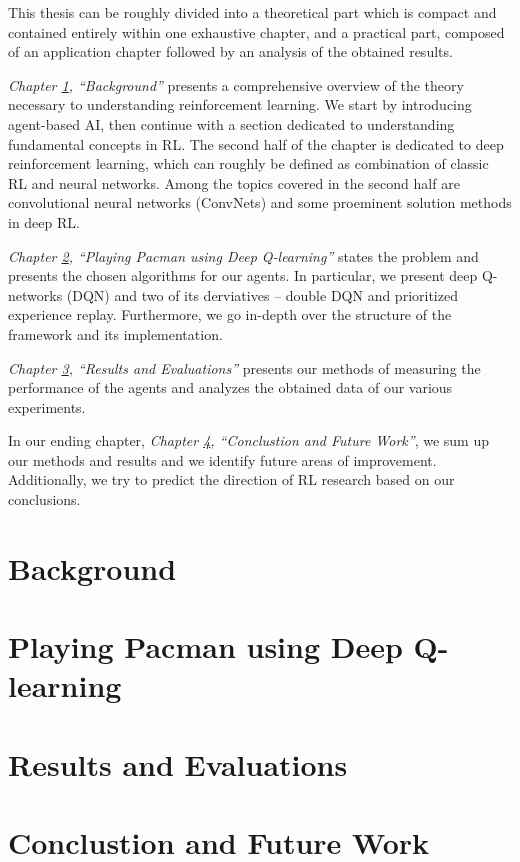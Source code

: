 \documentclass[12pt,twoside]{report}
\begin{document}
This thesis can be roughly divided into a theoretical part which is compact and contained entirely within one exhaustive chapter, and a practical part, composed of an application chapter followed by an analysis of the obtained results.

\emph{Chapter \ref{chapter:background}, ``Background''} presents a comprehensive overview of the theory necessary to understanding reinforcement learning.
We start by introducing agent-based AI, then continue with a
section dedicated to understanding fundamental concepts in RL.
The second half of the chapter is dedicated to deep reinforcement learning, which can roughly be defined as combination of classic RL and neural networks.
Among the topics covered in the second half are convolutional neural networks (ConvNets) and some proeminent solution methods in deep RL.

\emph{Chapter \ref{chapter:practical}, ``Playing Pacman using Deep Q-learning''} states the problem and presents the chosen algorithms for our agents.
In particular, we present deep Q-networks (DQN) and two of its derviatives -- double DQN and prioritized experience replay.
Furthermore, we go in-depth over the structure of the framework and its implementation.

\emph{Chapter \ref{chapter:results}, ``Results and Evaluations''} presents our methods of measuring the performance of the agents and analyzes the obtained data of our various experiments.

In our ending chapter, \emph{Chapter \ref{chapter:conclusion}, ``Conclustion and Future Work''}, we sum up our methods and results and we identify future areas of improvement. Additionally, we try to predict the direction of RL research based on our conclusions.

\chapter{Background} \label{chapter:background}


\chapter{Playing Pacman using Deep Q-learning} \label{chapter:practical}


\chapter{Results and Evaluations} \label{chapter:results}


\chapter{Conclustion and Future Work} \label{chapter:conclusion}



\end{document}

